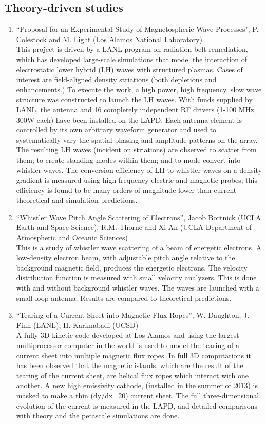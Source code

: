 \documentclass[11pt]{article}
\begin{document}
\subsection{Theory-driven studies}

\begin{enumerate}
\item ``Proposal for an Experimental Study of Magnetospheric Wave Processes",
P. Colestock and M. Light (Los Alamos National Laboratory)\\
This project is driven by a LANL program on radiation belt remediation, which has developed large-scale simulations that model the interaction of electrostatic lower hybrid (LH) waves with structured plasmas.  Cases of interest are field-aligned density striations (both depletions and enhancements.) To execute the work, a high power, high frequency, slow wave structure was constructed to launch the LH waves. With funds supplied by LANL, the antenna and 16 completely independent RF drivers (1-100 MHz, 300W each) have been installed on the LAPD. Each antenna element is controlled by its own arbitrary waveform generator and used to systematically vary the spatial phasing and amplitude patterns on the array.  The resulting LH waves (incident on striations) are observed to scatter from them; to create standing modes within them; and to mode convert into whistler waves.  The conversion efficiency of LH to whistler waves on a density gradient is measured using high-frequency electric and magnetic probes; this efficiency is found to be many orders of magnitude lower than current theoretical and simulation predictions. 

\item ``Whistler Wave Pitch Angle Scattering of Electrons'', Jacob
  Bortnick (UCLA Earth and Space Science), R.M. Thorne and Xi An (UCLA
  Department of Atmospheric and Oceanic Sciences)\\ This is a study of
  whistler wave scattering of a beam of energetic electrons. A
  low-density electron beam, with adjustable pitch angle relative to
  the background magnetic field, produces the energetic
  electrons. The velocity distribution function is measured with
  small velocity analyzers. This is done with and without
  background whistler waves. The waves are launched with a small
  loop antenna. Results are compared to theoretical predictions.

\item ``Tearing of a Current Sheet into Magnetic Flux Ropes'',
  W. Daughton, J. Finn (LANL), H. Karimabadi (UCSD)\\ A fully 3D
  kinetic code developed at Los Alamos and using the largest
  multiprocessor computer in the world is used to model the
  tearing of a current sheet into multiple magnetic flux ropes. In
  full 3D computations it has been observed that the magnetic islands,
  which are the result of the tearing of the current sheet, are helical
  flux ropes which interact with one another. A new high emissivity
  cathode, (installed in the summer of 2013) is masked to
  make a thin (dy/dx=20) current sheet. The full three-dimensional
  evolution of the current is measured in the LAPD, and detailed
  comparisons with theory and the petascale simulations are done.



\end{enumerate}
\end{document}
